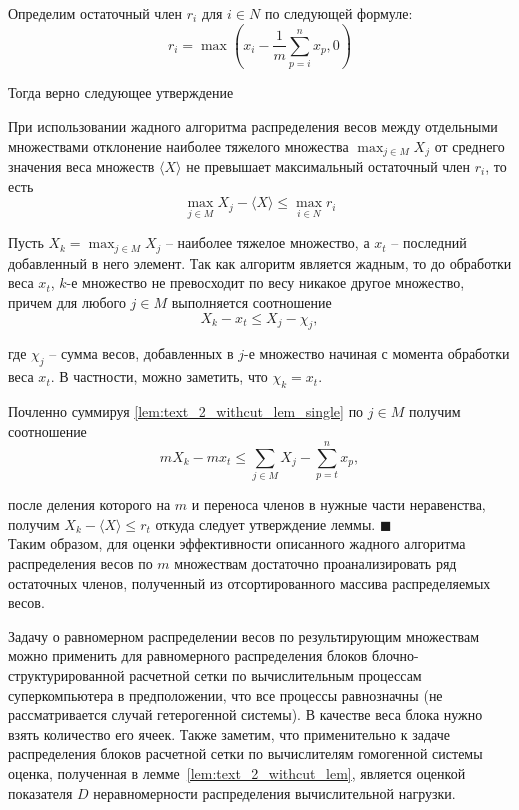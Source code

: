 Определим остаточный член $r_i$ для $i \in N$ по следующей формуле:
\begin{equation}
	r_i = \max{\left( x_i - \frac{1}{m} \sum_{p = i}^{n}{x_p}, 0 \right)}
\end{equation}

Тогда верно следующее утверждение

\begin{lemma}\label{lem:text_2_withcut_lem}
При использовании жадного алгоритма распределения весов между отдельными множествами отклонение наиболее тяжелого множества $\max_{j \in M}{X_j}$ от среднего значения веса множеств $\langle X \rangle$ не превышает максимальный остаточный член $r_i$, то есть
\begin{equation}
	\max_{j \in M}{X_j} - \langle X \rangle \le \max_{i \in N}{r_i}
\end{equation}
\end{lemma}
Пусть $X_k = \max_{j \in M}{X_j}$ -- наиболее тяжелое множество, а $x_t$ -- последний добавленный в него элемент.
Так как алгоритм является жадным, то до обработки веса $x_t$, $k$-е множество не превосходит по весу никакое другое множество, причем для любого $j \in M$ выполняется соотношение
\begin{equation}\label{lem:text_2_withcut_lem_single}
	X_k - x_t \le X_j - \chi_j,
\end{equation}	
	
где $\chi_j$ -- сумма весов, добавленных в $j$-е множество начиная с момента обработки веса $x_t$.
В частности, можно заметить, что $\chi_k = x_t$.

Почленно суммируя \eqref{lem:text_2_withcut_lem_single} по $j \in M$ получим соотношение
\begin{equation}
	m X_k - m x_t \le \sum_{j \in M}{X_j} - \sum_{p = t}^{n}{x_p},
\end{equation}

после деления которого на $m$ и переноса членов в нужные части неравенства, получим $X_k - \langle X \rangle \le r_t$ откуда следует утверждение леммы.
$\blacksquare$\\

Таким образом, для оценки эффективности описанного жадного алгоритма распределения весов по $m$ множествам достаточно проанализировать ряд остаточных членов, полученный из отсортированного массива распределяемых весов.

Задачу о равномерном распределении весов по результирующим множествам можно применить для равномерного распределения блоков блочно-структурированной расчетной сетки по вычислительным процессам суперкомпьютера в предположении, что все процессы равнозначны (не рассматривается случай гетерогенной системы).
В качестве веса блока нужно взять количество его ячеек.
Также заметим, что применительно к задаче распределения блоков расчетной сетки по вычислителям гомогенной системы оценка, полученная в лемме~\ref{lem:text_2_withcut_lem}, является оценкой показателя $D$ неравномерности распределения вычислительной нагрузки\label{term:decomp_neravn2}. 

